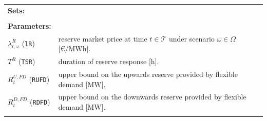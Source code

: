 \documentclass{article}
\begin{document}
\begin{tabularx}{\textwidth}{l l}
    \textbf{Sets:} \\
    \\
    \textbf{Parameters:} \\
    	$\lambda^{R}_{t, \omega}$ (\verb|lR|) & reserve market price at time $t \in \mathcal{T}$ under scenario $\omega \in \Omega$ [\euro/MWh]. \\
    	$T^R$ (\verb|TSR|) & duration of reserve response [h]. \\
    	$R^{U, FD}_t$ (\verb|RUFD|) & upper bound on the upwards reserve provided by flexible demand [MW]. \\
    	$R^{D, FD}_t$ (\verb|RDFD|) & upper bound on the downwards reserve provided by flexible demand [MW]. \\
    \\
       

\end{tabularx}
\end{document}
